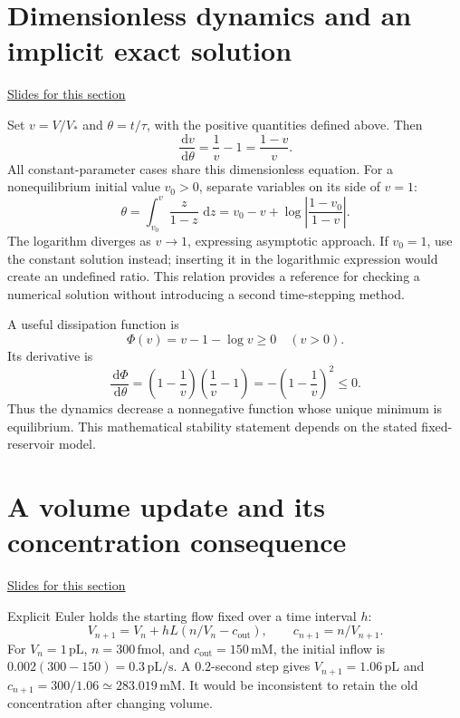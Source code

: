 \documentclass[11pt,letterpaper]{article}
\providecommand{\dd}{\,\mathrm{d}}\providecommand{\R}{\mathbb{R}}
\theoremstyle{definition}\newtheorem{definition}{Definition}\newtheorem{example}{Example}
\numberwithin{equation}{section}
\begin{document}
\section{Dimensionless dynamics and an implicit exact solution}
\hypertarget{note-dimensionless-dynamics-and-an-implicit-exact-solution}{}\label{note:dimensionless-dynamics-and-an-implicit-exact-solution}
{\small \href{slides.html\#frame=a-common-dimensionless-equation\&step=1}{Slides for this section}}\par
Set $v=V/V_*$ and $\theta=t/\tau$, with the positive quantities defined above. Then
\[
\frac{\dd v}{\dd\theta}=\frac1v-1=\frac{1-v}{v}.
\]
All constant-parameter cases share this dimensionless equation. For a nonequilibrium initial value $v_0>0$, separate variables on its side of $v=1$:
\[
\theta=\int_{v_0}^{v}\frac{z}{1-z}\,\dd z
=v_0-v+\log\left|\frac{1-v_0}{1-v}\right|.
\]
The logarithm diverges as $v\to1$, expressing asymptotic approach. If $v_0=1$, use the constant solution instead; inserting it in the logarithmic expression would create an undefined ratio. This relation provides a reference for checking a numerical solution without introducing a second time-stepping method.

A useful dissipation function is
\[
\Phi(v)=v-1-\log v\geq0\quad(v>0).
\]
Its derivative is
\[
\frac{\dd\Phi}{\dd\theta}
=\left(1-\frac1v\right)\left(\frac1v-1\right)
=-\left(1-\frac1v\right)^2\leq0.
\]
Thus the dynamics decrease a nonnegative function whose unique minimum is equilibrium. This mathematical stability statement depends on the stated fixed-reservoir model.
\section{A volume update and its concentration consequence}
\hypertarget{note-a-volume-update-and-its-concentration-consequence}{}\label{note:a-volume-update-and-its-concentration-consequence}
{\small \href{slides.html\#frame=one-signed-flow-calculation\&step=1}{Slides for this section}}\par
Explicit Euler holds the starting flow fixed over a time interval $h$:
\[
V_{n+1}=V_n+hL(n/V_n-c_{\mathrm{out}}),\qquad
c_{n+1}=n/V_{n+1}.
\]
For $V_n=1\,\mathrm{pL}$, $n=300\,\mathrm{fmol}$, and $c_{\mathrm{out}}=150\,\mathrm{mM}$, the initial inflow is $0.002(300-150)=0.3\,\mathrm{pL/s}$. A $0.2$-second step gives $V_{n+1}=1.06\,\mathrm{pL}$ and $c_{n+1}=300/1.06\simeq283.019\,\mathrm{mM}$. It would be inconsistent to retain the old concentration after changing volume.
\end{document}
